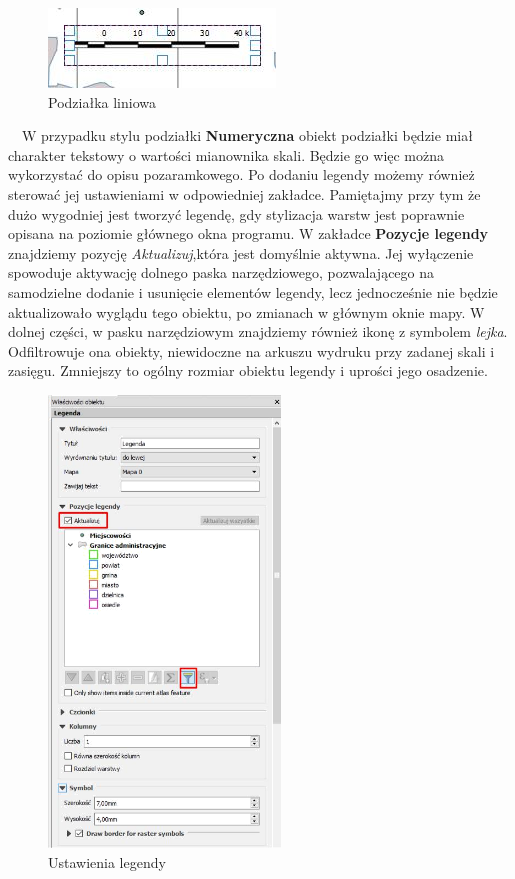 \documentclass[12pt,a4paper]{book}
\begin{document}
\begin{figure}[ht]
	\centering
	\includegraphics[width=6.033cm,height=2.117cm]{008-podzialka-liniowa.jpg}
	\caption{Podziałka liniowa}
\end{figure}
\ \ W przypadku stylu podziałki \textbf{Numeryczna }obiekt podziałki będzie miał charakter tekstowy o wartości mianownika skali. Będzie go więc można wykorzystać do opisu pozaramkowego. Po dodaniu legendy możemy również sterować jej ustawieniami w odpowiedniej zakładce. Pamiętajmy przy tym że dużo wygodniej jest tworzyć legendę, gdy stylizacja warstw jest poprawnie opisana na poziomie głównego okna programu. W zakładce \textbf{Pozycje legendy }znajdziemy pozycję \textit{Aktualizuj},która jest domyślnie aktywna. Jej wyłączenie\textbf{ }spowoduje aktywację dolnego paska narzędziowego, pozwalającego na samodzielne dodanie i usunięcie elementów legendy, lecz jednocześnie nie będzie aktualizowało wyglądu tego obiektu, po zmianach w głównym oknie mapy. W dolnej części, w pasku narzędziowym znajdziemy również ikonę z symbolem \textit{lejka}. Odfiltrowuje ona obiekty, niewidoczne na arkuszu wydruku przy zadanej skali i zasięgu. Zmniejszy to ogólny rozmiar obiektu legendy i uprości jego osadzenie.
\begin{figure}[ht]
	\centering
	\includegraphics[height=12cm]{008-ustawienia-legendy.png}
	\caption{Ustawienia legendy}
\end{figure}
\end{document}
